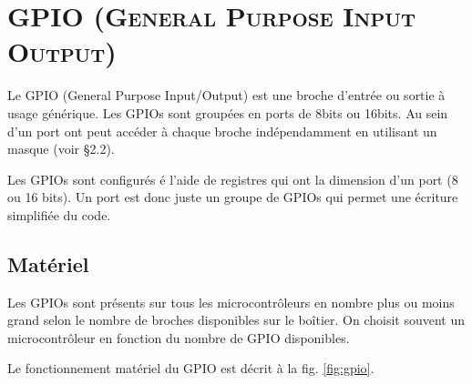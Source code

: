 \chapter{\textsc{GPIO (General Purpose Input Output)}}

Le GPIO (General Purpose Input/Output) est une broche d'entrée ou sortie à usage générique. Les GPIOs sont groupées en ports de 8bits ou 16bits. Au sein d'un port ont peut accéder à chaque broche indépendamment en utilisant un masque (voir §2.2).

Les GPIOs sont configurés é l'aide de registres qui ont la dimension d'un port (8 ou 16 bits). Un port est donc juste un groupe de GPIOs qui permet une écriture simplifiée du code.


\section{Matériel}

Les GPIOs sont présents sur tous les microcontrôleurs en nombre plus ou moins grand selon le nombre de broches disponibles sur le boîtier. On choisit souvent un microcontrôleur en fonction du nombre de GPIO disponibles.

Le fonctionnement matériel du GPIO est décrit à la fig. \ref{fig:gpio}. 

